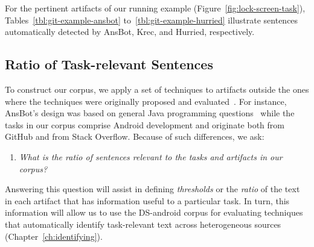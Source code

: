 For the pertinent artifacts of our running example (Figure~\ref{fig:lock-screen-task}), 
Tables~\ref{tbl:git-example-ansbot} to~\ref{tbl:git-example-hurried}
illustrate sentences automatically detected by \acs{AnsBot}, \acs{Krec}, and \acs{Hurried}, respectively.
 












\subsection{Ratio of Task-relevant Sentences}
\label{cp4:evaluation}


To construct our corpus, we apply a set of techniques 
to artifacts outside the ones where the techniques were originally proposed and evaluated~\cite{nadi2020, Robillard2015, Lotufo2012, Xu2017}.
For instance, \acs{AnsBot}'s design was based on general Java programming questions~\cite{Xu2017} while the tasks in our corpus comprise Android development and originate both from GitHub and from Stack Overflow. Because of such differences, we ask:


\begin{enumerate}[label={},leftmargin=0.7cm]
\item \textit{What is the ratio of sentences relevant to the tasks and artifacts in our corpus?} 

\end{enumerate}




Answering this question will assist in defining \textit{thresholds} or the \textit{ratio}
of the text in each artifact that has information useful to a particular task.
In turn, this information will allow us to use the \acs{DS-android} corpus for evaluating techniques that automatically identify task-relevant text across heterogeneous sources (Chapter~\ref{ch:identifying}).



